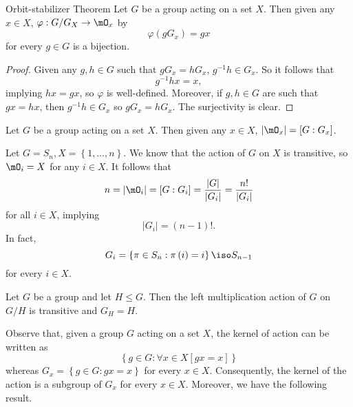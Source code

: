 \documentclass[pmath347]{subfiles}
\begin{document}
    \begin{theorem}{Orbit-stabilizer Theorem}
        Let $G$ be a group acting on a set $X$. Then given any $x\in X$, $\varphi:G /G_X\to\mO_x$ by
        \begin{equation*}
            \varphi\left( gG_x \right) = gx
        \end{equation*}
        for every $g\in G$ is a bijection.
    \end{theorem}

    \begin{proof}
        Given any $g,h\in G$ such that $gG_x = hG_x$, $g^{-1} h\in G_x$. So it follows that
        \begin{equation*}
            g^{-1} hx = x,
        \end{equation*}
        implying $hx = gx$, so $\varphi$ is well-defined. Moreover, if $g,h\in G$ are such that $gx=hx$, then $g^{-1} h\in G_x$ so $gG_x = hG_x$. The surjectivity is clear.
    \end{proof}

    \begin{cor}{}
        Let $G$ be a group acting on a set $X$. Then given any $x\in X$, $\left| \mO_x \right| = \left[ G:G_x \right] $.
    \end{cor}	

    \ex Let $G=S_n, X=\left\lbrace 1,\ldots,n \right\rbrace$. We know that the action of $G$ on $X$ is transitive, so $\mO_i =X$ for any $i\in X$. It follows that
    \begin{equation*}
        n = \left| \mO_i \right| = \left[ G:G_i \right] = \frac{\left| G \right| }{\left| G_i \right| } = \frac{n!}{\left| G_i \right| }
    \end{equation*}
    for all $i\in X$, implying
    \begin{equation*}
        \left| G_i \right| = \left( n-1 \right) !.
    \end{equation*}
    In fact,
    \begin{equation*}
        G_i = \left\lbrace \pi\in S_n: \pi\left( i \right) =i \right\rbrace \iso S_{n-1}
    \end{equation*}
    for every $i\in X$.

    \begin{prop}{}
        Let $G$ be a group and let $H\leq G$. Then the left multiplication action of $G$ on $G /H$ is transitive and $G_H = H$.
    \end{prop}

    \np Observe that, given a group $G$ acting on a set $X$, the kernel of action can be written as
    \begin{equation*}
        \left\lbrace g\in G:\forall x\in X\left[ gx=x \right]  \right\rbrace 
    \end{equation*}
    whereas $G_x = \left\lbrace g\in G: gx = x \right\rbrace$ for every $x\in X$. Consequently, the kernel of the action is a subgroup of $G_x$ for every $x\in X$. Moreover, we have the following result.
\end{document}

